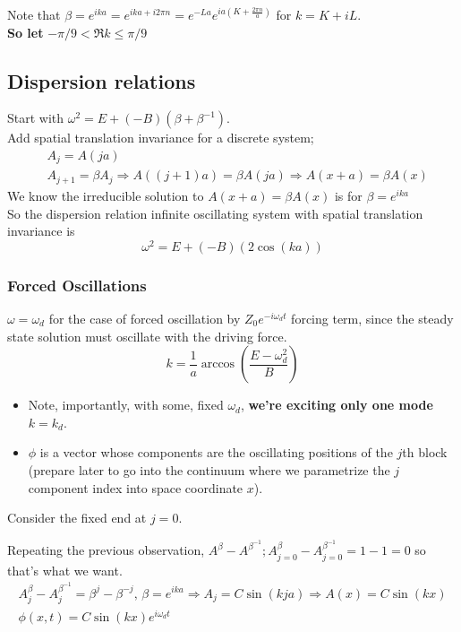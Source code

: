 \documentclass[twoside, 10pt]{amsart}
\begin{document}
Note that $\beta = e^{ika} = e^{ika + i 2\pi n} = e^{-La} e^{ia (K+ \frac{ 2\pi n}{a} ) } $ for $k = K+ iL$.  \bigskip \\
\quad \textbf{ So let } $ -\pi/9 < \Re k \leq \pi/9$ 

\subsection{ Dispersion relations}

Start with $\omega^2 = E + (-B)(\beta + \beta^{-1})$.  \medskip \\
Add spatial translation invariance for a discrete system; 
\[
\begin{aligned}
& A_j = A(ja)  \\
& A_{j+1} = \beta A_j \Longrightarrow A((j+1)a) = \beta A(ja) \Longrightarrow A(x+a) = \beta A(x) 
\end{aligned}
\]
We know the irreducible solution to $A(x+a) = \beta A(x)$ is for $\beta = e^{i ka}$ \medskip \\
\quad \quad So the dispersion relation infinite oscillating system with spatial translation invariance is 
\begin{equation}
  \boxed{ \omega^2 = E + (-B)(2 \cos{ (ka)} ) }
\end{equation}

\subsubsection{ Forced Oscillations }
$\omega = \omega_d$ for the case of forced oscillation by $Z_0 e^{-i \omega_d t }$ forcing term, since the steady state solution must oscillate with the driving force.  
\[
k = \frac{1}{a} \arccos{ \left( \frac{ E- \omega_d^2 }{ B} \right) } 
\]

\begin{itemize}
\item Note, importantly, with some, fixed $\omega_d$, \textbf{ we're exciting only one mode} $k=k_d$. 
\item $\phi$ is a vector whose components are the oscillating positions of the $j$th block (prepare later to go into the continuum where we parametrize the $j$ component index into space coordinate $x$).  
\end{itemize}

Consider the fixed end at $j=0$.  

Repeating the previous observation, $A^{\beta} -A^{\beta^{-1}}; A_{j=0}^{\beta} - A_{j=0}^{\beta^{-1}} = 1 - 1 =0 $ so that's what we want.  
\[
\begin{gathered}
  A_j^{\beta} - A_j^{\beta^{-1}} = \beta^j -\beta^{-j}, \, \beta = e^{ika}
  \Longrightarrow A_j = C \sin{(kja)} \Longrightarrow A(x) = C \sin{ (kx)} \\
  \phi(x,t) = C \sin{ (kx)}e^{i\omega_d t} \\
\end{gathered}
\] 
\end{document}

